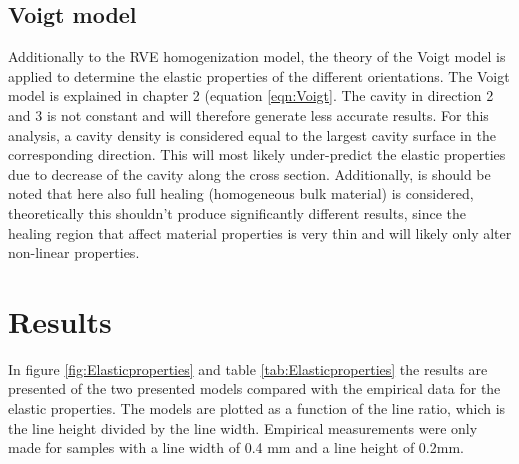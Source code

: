 \subsection{Voigt model}
Additionally to the RVE homogenization model, the theory of the Voigt model is applied to determine the elastic properties of the different orientations. The Voigt model is explained in chapter 2 (equation \ref{eqn:Voigt}. The cavity in direction 2 and 3 is not constant and will therefore generate less accurate results. For this analysis, a cavity density is considered equal to the largest cavity surface in the corresponding direction. This will most likely under-predict the elastic properties due to decrease of the cavity along the cross section. Additionally, is should be noted that here also full healing (homogeneous bulk material) is considered, theoretically this shouldn't produce significantly different results, since the healing region that affect material properties is very thin and will likely only alter non-linear properties. 

\section{Results}
In figure \ref{fig:Elasticproperties}  and table \ref{tab:Elasticproperties} the results are presented of the two presented models compared with the empirical data for the elastic properties.  The models are plotted as a function of the line ratio, which is the line height divided by the line width. Empirical measurements were only made for samples with a line width of 0.4 mm and a line height of 0.2mm.


